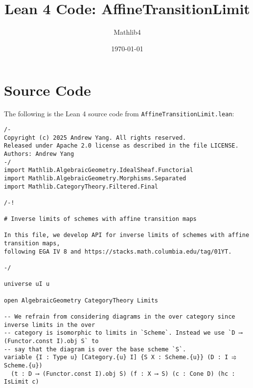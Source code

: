 \documentclass{article}
\title{Lean 4 Code: AffineTransitionLimit}
\author{Mathlib4}
\date{\today}
\begin{document}
\maketitle

\section{Source Code}

The following is the Lean 4 source code from \texttt{AffineTransitionLimit.lean}:

\begin{lstlisting}[language=Lean, caption={AffineTransitionLimit.lean}]
/-
Copyright (c) 2025 Andrew Yang. All rights reserved.
Released under Apache 2.0 license as described in the file LICENSE.
Authors: Andrew Yang
-/
import Mathlib.AlgebraicGeometry.IdealSheaf.Functorial
import Mathlib.AlgebraicGeometry.Morphisms.Separated
import Mathlib.CategoryTheory.Filtered.Final

/-!

# Inverse limits of schemes with affine transition maps

In this file, we develop API for inverse limits of schemes with affine transition maps,
following EGA IV 8 and https://stacks.math.columbia.edu/tag/01YT.

-/

universe uI u

open AlgebraicGeometry CategoryTheory Limits

-- We refrain from considering diagrams in the over category since inverse limits in the over
-- category is isomorphic to limits in `Scheme`. Instead we use `D ⟶ (Functor.const I).obj S` to
-- say that the diagram is over the base scheme `S`.
variable {I : Type u} [Category.{u} I] {S X : Scheme.{u}} (D : I ⥤ Scheme.{u})
  (t : D ⟶ (Functor.const I).obj S) (f : X ⟶ S) (c : Cone D) (hc : IsLimit c)


\end{lstlisting}
\end{document}
